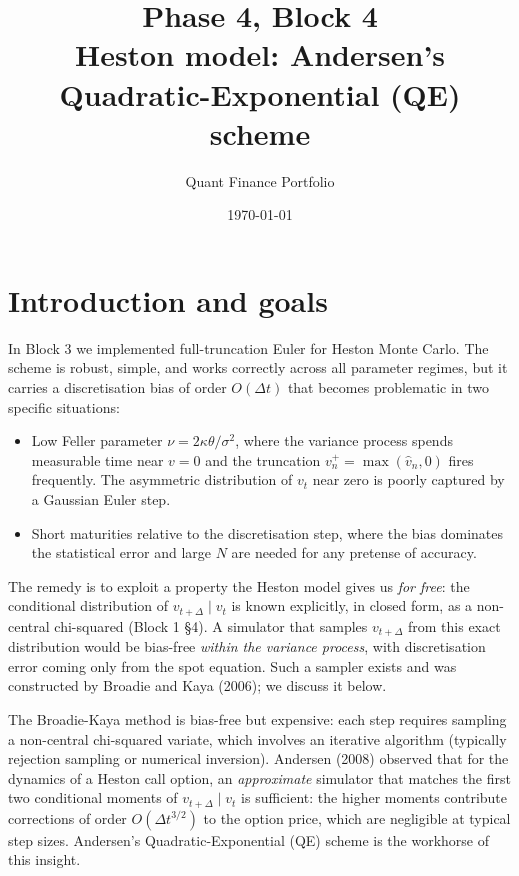 \documentclass[11pt]{article}
\title{Phase 4, Block 4 \\[0.3em]\Large Heston model: Andersen's Quadratic-Exponential (QE) scheme}
\author{Quant Finance Portfolio}
\date{\today}
\theoremstyle{plain}
\theoremstyle{definition}
\theoremstyle{remark}
\begin{document}
\maketitle
\tableofcontents
\bigskip

\section{Introduction and goals}

In Block 3 we implemented full-truncation Euler for Heston Monte Carlo. The scheme is robust, simple, and works correctly across all parameter regimes, but it carries a discretisation bias of order $O(\Delta t)$ that becomes problematic in two specific situations:

\begin{itemize}[topsep=2pt]
    \item Low Feller parameter $\nu = 2\kappa\theta/\sigma^2$, where the variance process spends measurable time near $v = 0$ and the truncation $v_n^+ = \max(\hat v_n, 0)$ fires frequently. The asymmetric distribution of $v_t$ near zero is poorly captured by a Gaussian Euler step.
    \item Short maturities relative to the discretisation step, where the bias dominates the statistical error and large $N$ are needed for any pretense of accuracy.
\end{itemize}

The remedy is to exploit a property the Heston model gives us \emph{for free}: the conditional distribution of $v_{t+\Delta} \mid v_t$ is known explicitly, in closed form, as a non-central chi-squared (Block 1 \S4). A simulator that samples $v_{t+\Delta}$ from this exact distribution would be bias-free \emph{within the variance process}, with discretisation error coming only from the spot equation. Such a sampler exists and was constructed by Broadie and Kaya (2006); we discuss it below.

The Broadie-Kaya method is bias-free but expensive: each step requires sampling a non-central chi-squared variate, which involves an iterative algorithm (typically rejection sampling or numerical inversion). Andersen (2008) observed that for the dynamics of a Heston call option, an \emph{approximate} simulator that matches the first two conditional moments of $v_{t+\Delta} \mid v_t$ is sufficient: the higher moments contribute corrections of order $O(\Delta t^{3/2})$ to the option price, which are negligible at typical step sizes. Andersen's Quadratic-Exponential (QE) scheme is the workhorse of this insight.
\end{document}
